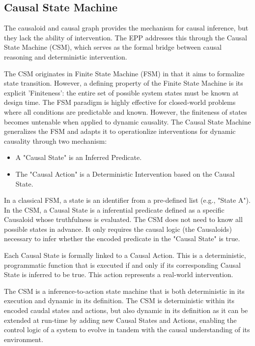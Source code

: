 \subsection{Causal State Machine}
\label{sec:epp_csm}

The causaloid and causal graph provides the mechanism for causal inference, 
but they lack the ability of intervention. The EPP addresses this through the Causal State Machine (CSM), which serves as the formal bridge between causal reasoning and deterministic intervention.

The CSM originates in Finite State Machine (FSM) in that it aims to formalize state transition.
However, a defining property of the Finite State Machine is its explicit 'Finiteness': the entire set of possible system states must be known at design time. The FSM paradigm is highly effective for closed-world problems where all conditions are predictable and known. However, the finiteness of states becomes untenable when applied to dynamic causality. The Causal State Machine generalizes the FSM and adapts it 
to operationlize interventions for dynamic causality through two mechanism:
 
\begin{itemize}
	\item A "Causal State" is an Inferred Predicate. 
	\item The "Causal Action" is a Deterministic Intervention based on the  Causal State.
\end{itemize}

In a classical FSM, a state is an identifier from a pre-defined list (e.g., "State A").
In the CSM, a Causal State is a inferential predicate defined as a specific Causaloid whose truthfulness is evaluated. The CSM does not need to know all possible states in advance. It only requires the causal logic (the Causaloids) necessary to infer whether the encoded predicate in the "Causal State" is true. 

Each Causal State is formally linked to a Causal Action. This is a deterministic, programmatic function that is executed if and only if its corresponding Causal State is inferred to be true. This action represents a real-world intervention.

The CSM is a inference-to-action state machine that is both deterministic in its execution and dynamic in its definition. The CSM is deterministic within its encoded caudal states and actions, but also dynamic in its definition as it can be extended at run-time by adding new Causal States and Actions, enabling the control logic of a system to evolve in tandem with the causal understanding of its environment. 

